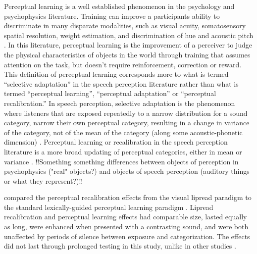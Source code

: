 Perceptual learning is a well established phenomenon in the psychology and psychophysics literature. 
Training can improve a participants ability to discriminate in many disparate modalities, such as visual acuity, somatosensory spatial resolution, weight estimation, and discrimination of hue and acoustic pitch \citep[for review]{Gibson1953}. 
 In this literature, perceptual learning is the improvement of a perceiver to judge the physical characteristics of objects in the world through training that assumes attention on the task, but doesn't require reinforcement, correction or reward.
This definition of perceptual learning corresponds more to what is termed ``selective adaptation'' in the speech perception literature rather than what is termed ``perceptual learning'', ``perceptual adaptation'' or ``perceptual recalibration.''  
In speech perception, selective adaptation is the phenomenon where listeners that are exposed repeatedly to a narrow distribution for a sound category, narrow their own perceptual category, resulting in a change in variance of the category, not of the mean of the category (along some acoustic-phonetic dimension) \citep{Eimas1973,Samuel1986,Vroomen2007}.
Perceptual learning or recalibration in the speech perception literature is a more broad updating of perceptual categories, either in mean or variance \citep{Norris2003, Vroomen2007}.  
!!Something something differences between objects of perception in psychophysics ("real" objects?) and objects of speech perception (auditory things or what they represent?)!!








\citet{vanLinden2007} compared the perceptual recalibration effects from the visual lipread paradigm \citep{Bertelson2003} to the standard lexically-guided perceptual learning paradigm \citep{Norris2003}.  
Lipread recalibration and perceptual learning effects had comparable size, lasted equally as long, were enhanced when presented with a contrasting sound, and were both unaffected by periods of silence between exposure and categorization.  
The effects did not last through prolonged testing in this study, unlike in other studies \citep{Kraljic2005,Eisner2006}.

